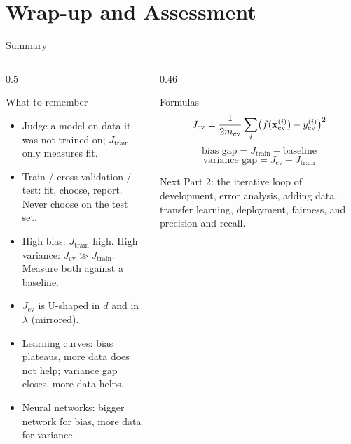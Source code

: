 \documentclass[aspectratio=169,10pt]{beamer}
\begin{document}
\section{Wrap-up and Assessment}

\begin{frame}{Summary}
  \begin{columns}[T,onlytextwidth]
    \begin{column}{0.5\textwidth}
      \begin{block}{What to remember}
        \footnotesize
        \begin{itemize}
          \item Judge a model on data it was not trained on; $J_{\text{train}}$ only
                measures fit.
          \item Train / cross-validation / test: fit, choose, report. Never choose on the
                test set.
          \item High bias: $J_{\text{train}}$ high. High variance:
                $J_{\text{cv}}\gg J_{\text{train}}$. Measure both against a baseline.
          \item $J_{\text{cv}}$ is U-shaped in $d$ and in $\lambda$ (mirrored).
          \item Learning curves: bias plateaus, more data does not help; variance gap
                closes, more data helps.
          \item Neural networks: bigger network for bias, more data for variance.
        \end{itemize}
      \end{block}
    \end{column}
    \begin{column}{0.46\textwidth}
      \begin{block}{Formulas}
        \[ J_{\text{cv}}=\frac{1}{2m_{\text{cv}}}\sum_{i}\bigl(f(\mathbf{x}_{\text{cv}}^{(i)})-y_{\text{cv}}^{(i)}\bigr)^2 \]
        \[ \text{bias gap}=J_{\text{train}}-\text{baseline} \]
        \[ \text{variance gap}=J_{\text{cv}}-J_{\text{train}} \]
      \end{block}
      \begin{block}{Next}
        \footnotesize Part 2: the iterative loop of development, error analysis, adding
        data, transfer learning, deployment, fairness, and precision and recall.
      \end{block}
    \end{column}
  \end{columns}
\end{frame}
\end{document}
